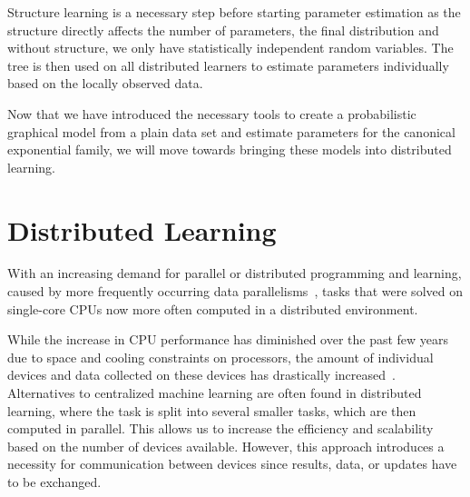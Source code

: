 Structure learning is a necessary step before starting parameter estimation as the structure directly affects the number of parameters, the final distribution and without structure, we only have statistically independent random variables. 
The tree is then used on all distributed learners to estimate parameters individually based on the locally observed data. 

Now that we have introduced the necessary tools to create a probabilistic graphical model from a plain data set and estimate parameters for the canonical exponential family, we will move towards bringing these models into distributed learning.


\section{Distributed Learning}
With an increasing demand for parallel or distributed programming and learning, caused by more frequently occurring data parallelisms~\cite{ben2006principles}, tasks that were solved on single-core CPUs now more often computed in a distributed environment.

While the increase in CPU performance has diminished over the past few years~\cite{herlihy2011art} due to space and cooling constraints on processors, the amount of individual devices and data collected on these devices has drastically increased~\cite{kaisler2013big}.
Alternatives to centralized machine learning are often found in distributed learning, where the task is split into several smaller tasks, which are then computed in parallel. 
This allows us to increase the efficiency and scalability based on the number of devices available.
However, this approach introduces a necessity for communication between devices since results, data, or updates have to be exchanged.

